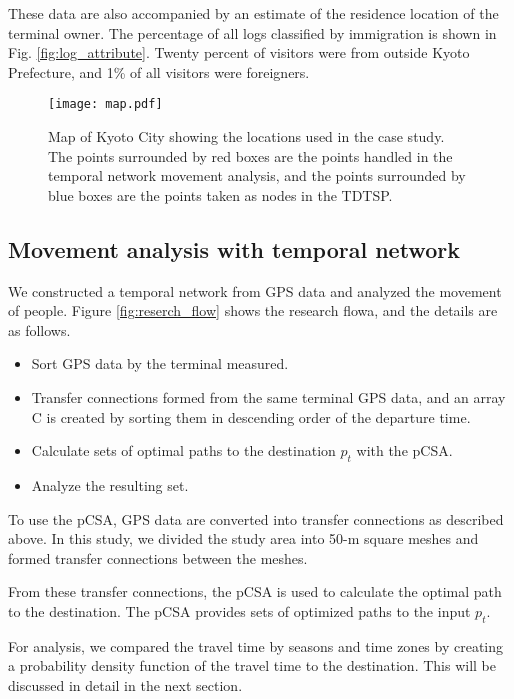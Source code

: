\documentclass[conference]{IEEEtran}
\begin{document}
\par These data are also accompanied by an estimate of the residence location of the terminal owner.
The percentage of all logs classified by immigration is shown in Fig. \ref{fig:log_attribute}.
Twenty percent of visitors were from outside Kyoto Prefecture, and 1\% of all visitors were foreigners.

\begin{figure*}[tb]
\begin{center}
\texttt{[image: map.pdf]}
\caption{Map of Kyoto City showing the locations used in the case study.
The points surrounded by red boxes are the points handled in the temporal network movement analysis, and the points surrounded by blue boxes are the points taken as nodes in the TDTSP.
}
		\label{fig:map}
	\end{center}
\end{figure*}

\subsection{Movement analysis with temporal network}
\par We constructed a temporal network from GPS data and analyzed the movement of people.
Figure \ref{fig:reserch_flow} shows the research flowa, and the details are as follows.

\begin{itemize}
 \item Sort GPS data by the terminal measured.
 \item Transfer connections formed from the same terminal GPS data, and an array C is created by sorting them in descending order of the departure time.
 \item Calculate sets of optimal paths to the destination $p_t$ with the pCSA.
 \item Analyze the resulting set.
\end{itemize}

\par To use the pCSA, GPS data are converted into transfer connections as described above.
In this study, we divided the study area into 50-m square meshes and formed transfer connections between the meshes.
\par From these transfer connections, the pCSA is used to calculate the optimal path to the destination.
The pCSA provides sets of optimized paths to the input $p_t$.
\par For analysis, we compared the travel time by seasons and time zones by creating a probability density function of the travel time to the destination.
This will be discussed in detail in the next section.
\end{document}
